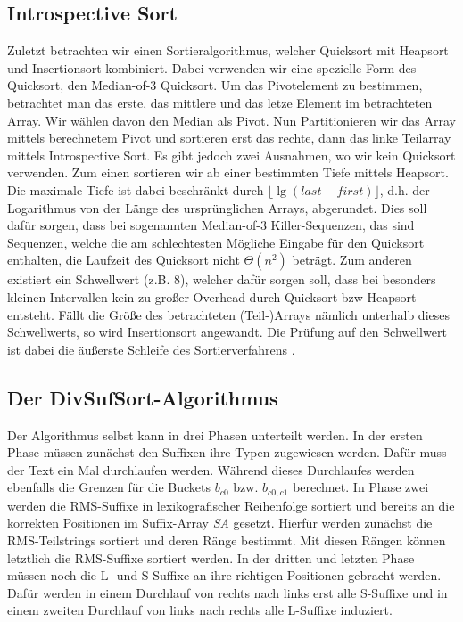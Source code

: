 \subsection{Introspective Sort}
Zuletzt betrachten wir einen Sortieralgorithmus, welcher Quicksort mit Heapsort und Insertionsort kombiniert. Dabei verwenden wir eine spezielle Form des Quicksort, den Median-of-3 Quicksort. Um das Pivotelement zu bestimmen, betrachtet man das erste, das mittlere und das letze Element im betrachteten Array. Wir wählen davon den Median als Pivot. Nun Partitionieren wir das Array mittels berechnetem Pivot und sortieren erst das rechte, dann das linke Teilarray mittels Introspective Sort. Es gibt jedoch zwei Ausnahmen, wo wir kein Quicksort verwenden. Zum einen sortieren wir ab einer bestimmten Tiefe mittels Heapsort. Die maximale Tiefe ist dabei beschränkt durch $\lfloor \lg (last - first) \rfloor$, d.h. der Logarithmus von der Länge des ursprünglichen Arrays, abgerundet. Dies soll dafür sorgen, dass bei sogenannten Median-of-3 \glqq Killer-Sequenzen\grqq{}, das sind Sequenzen, welche die am schlechtesten Mögliche Eingabe für den Quicksort enthalten, die Laufzeit des Quicksort nicht $\Theta (n^2)$ beträgt. Zum anderen existiert ein Schwellwert (z.B. 8), welcher dafür sorgen soll, dass bei besonders kleinen Intervallen kein zu großer Overhead durch Quicksort bzw Heapsort entsteht. Fällt die Größe des betrachteten (Teil-)Arrays nämlich unterhalb dieses Schwellwerts, so wird Insertionsort angewandt. Die Prüfung auf den Schwellwert ist dabei die äußerste Schleife des Sortierverfahrens \cite{Musser97}.

\fi



\subsection{Der DivSufSort-Algorithmus}

Der Algorithmus selbst kann in drei Phasen unterteilt werden. In der ersten Phase müssen zunächst den Suffixen ihre Typen zugewiesen werden. Dafür muss der Text ein Mal durchlaufen werden. Während dieses Durchlaufes werden ebenfalls die Grenzen für die Buckets $b_{c0}$ bzw. $b_{c0,c1}$ berechnet. In Phase zwei werden die RMS-Suffixe in lexikografischer Reihenfolge sortiert und bereits an die korrekten Positionen im Suffix-Array \textit{SA} gesetzt. Hierfür werden zunächst die RMS-Teilstrings sortiert und deren Ränge bestimmt. Mit diesen Rängen können letztlich die RMS-Suffixe sortiert werden. In der dritten und letzten Phase müssen noch die L- und S-Suffixe an ihre richtigen Positionen gebracht werden. Dafür werden in einem Durchlauf von rechts nach links erst alle S-Suffixe und in einem zweiten Durchlauf von links nach rechts alle L-Suffixe induziert.

